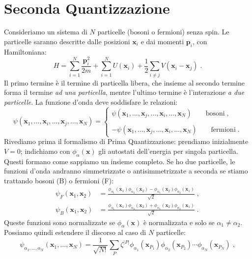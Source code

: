 \documentclass[10pt,a4paper]{report}
\theoremstyle{definition}
\numberwithin{equation}{section}
\begin{document}
\section{Seconda Quantizzazione}
Consideriamo un sistema di $N$ particelle (bosoni o fermioni) senza spin. Le particelle saranno descritte dalle posizioni $\mathbf{x}_i$ e dai momenti $\mathbf{p}_i$, con Hamiltoniana:
\begin{equation}
H=\sum_{i=1}^N \frac{\mathbf{p}_i^2}{2m}+\sum_{i=1}^N U(\mathbf{x}_i)+\frac{1}{2}\sum_{i\neq j}V(\mathbf{x}_i-\mathbf{x}_j)\;. \label{ch2_hamsecqua}
\end{equation}
Il primo termine è il termine di particella libera, che insieme al secondo termine forma il termine \emph{ad una particella}, mentre l'ultimo termine è l'interazione \emph{a due particelle}. La funzione d'onda deve soddisfare le relazioni:
\begin{equation}
\psi(\mathbf{x}_1,\ldots,\mathbf{x}_i,\ldots,\mathbf{x}_j,\ldots,\mathbf{x}_N)=\begin{cases}
\psi(\mathbf{x}_1,\ldots,\mathbf{x}_j,\ldots,\mathbf{x}_i,\ldots,\mathbf{x}_N)\qquad \mbox{bosoni}\;, \\
\\
-\psi(\mathbf{x}_1,\ldots,\mathbf{x}_j,\ldots,\mathbf{x}_i,\ldots,\mathbf{x}_N)\qquad \mbox{fermioni}\;.
\end{cases}
\end{equation}
Rivediamo prima il formalismo di Prima Quantizzazione: prendiamo inizialmente $V=0$; indichiamo con $\phi_{\alpha}(\mathbf{x})$ gli autostati dell'energia per singola particella. Questi formano come sappiamo un insieme completo. Se ho due particelle, le funzioni d'onda andranno simmetrizzate o antisimmetrizzate a seconda se stiamo trattando bosoni (B) o fermioni (F):
\begin{align*}
\psi_F(\mathbf{x}_1,\mathbf{x}_2)&=\frac{\phi_{\alpha_1}(\mathbf{x}_1)\phi_{\alpha_2}(\mathbf{x}_2)-\phi_{\alpha_1}(\mathbf{x}_2)\phi_{\alpha_2}(\mathbf{x}_1)}{\sqrt{2}}\;, \\
\psi_B(\mathbf{x}_1,\mathbf{x}_2)&=\frac{\phi_{\alpha_1}(\mathbf{x}_1)\phi_{\alpha_2}(\mathbf{x}_2)+\phi_{\alpha_1}(\mathbf{x}_2)\phi_{\alpha_2}(\mathbf{x}_1)}{\sqrt{2}}\;.
\end{align*}
Queste funzioni sono normalizzate se $\phi_{\alpha}(\mathbf{x})$ è normalizzata e solo se $\alpha_1\neq\alpha_2$. Possiamo quindi estendere il discorso al caso di $N$ particelle:
\begin{equation}
\psi_{\alpha_1,\ldots,\alpha_N}(\mathbf{x}_1,\ldots,\mathbf{x}_N)=\frac{1}{\sqrt{N!}}\sum_P\zeta^{|P|}\phi_{\alpha_1}(\mathbf{x}_{P_1})\phi_{\alpha_2}(\mathbf{x}_{P_2})\cdots\phi_{\alpha_N}(\mathbf{x}_{P_N})\;,
\end{equation}
\end{document}
